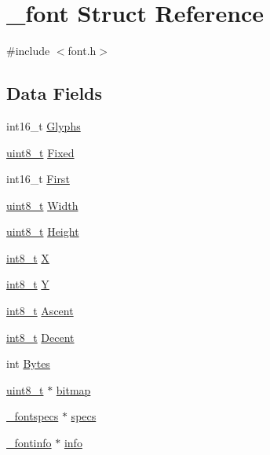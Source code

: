 \hypertarget{struct__font}{\section{\-\_\-font Struct Reference}
\label{struct__font}
}


{\ttfamily \#include $<$font.\-h$>$}

\subsection*{Data Fields}
\begin{DoxyCompactItemize}
\item 
int16\-\_\-t \hyperlink{struct__font_a1e89c06fc11a730eb602522dc8953491}{Glyphs}
\item 
\hyperlink{send_8c_aba7bc1797add20fe3efdf37ced1182c5}{uint8\-\_\-t} \hyperlink{struct__font_a76218c6b35acb78926429f247cbaa687}{Fixed}
\item 
int16\-\_\-t \hyperlink{struct__font_a73decb2a2c2880dc782cd9cda5561876}{First}
\item 
\hyperlink{send_8c_aba7bc1797add20fe3efdf37ced1182c5}{uint8\-\_\-t} \hyperlink{struct__font_ae3d3b48670f1bf4bf6dbf42794f81b31}{Width}
\item 
\hyperlink{send_8c_aba7bc1797add20fe3efdf37ced1182c5}{uint8\-\_\-t} \hyperlink{struct__font_a5888921d1a78bf917351a275e2033467}{Height}
\item 
\hyperlink{earth2wireframe_8c_aef44329758059c91c76d334e8fc09700}{int8\-\_\-t} \hyperlink{struct__font_a64a08fdbdaa19418a9b7a34a2db33150}{X}
\item 
\hyperlink{earth2wireframe_8c_aef44329758059c91c76d334e8fc09700}{int8\-\_\-t} \hyperlink{struct__font_a3c9fee9cfcc713b1aac812c14dd9a36a}{Y}
\item 
\hyperlink{earth2wireframe_8c_aef44329758059c91c76d334e8fc09700}{int8\-\_\-t} \hyperlink{struct__font_a998e54724f56879aa85c5ec169873f39}{Ascent}
\item 
\hyperlink{earth2wireframe_8c_aef44329758059c91c76d334e8fc09700}{int8\-\_\-t} \hyperlink{struct__font_a7f3567884a6aa454b7414b10dba35755}{Decent}
\item 
int \hyperlink{struct__font_a13b0b0e4e91f4d663ba4c3c11bfbda8a}{Bytes}
\item 
\hyperlink{send_8c_aba7bc1797add20fe3efdf37ced1182c5}{uint8\-\_\-t} $\ast$ \hyperlink{struct__font_a336f543c3fe3d3197c6e709fa7df0f5b}{bitmap}
\item 
\hyperlink{struct__fontspecs}{\-\_\-fontspecs} $\ast$ \hyperlink{struct__font_a76b5b07cf75a869627eca27d7a32836a}{specs}
\item 
\hyperlink{struct__fontinfo}{\-\_\-fontinfo} $\ast$ \hyperlink{struct__font_abf134e8a44e707d3b4e83ab76c952ed9}{info}
\end{DoxyCompactItemize}


